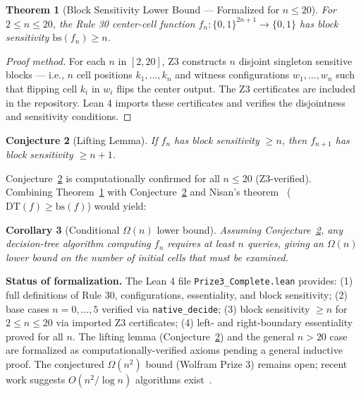 \documentclass[11pt]{article}
\newtheorem{theorem}{Theorem}
\newtheorem{corollary}[theorem]{Corollary}
\newtheorem{conjecture}[theorem]{Conjecture}
\begin{document}
\begin{theorem}[Block Sensitivity Lower Bound --- Formalized for $n \leq 20$]
\label{thm:bs}
For $2 \leq n \leq 20$, the Rule 30 center-cell function $f_n : \{0,1\}^{2n+1} \to \{0,1\}$ has block sensitivity $\mathrm{bs}(f_n) \geq n$.
\end{theorem}

\begin{proof}[Proof method]
For each $n$ in $[2, 20]$, Z3 constructs $n$ disjoint singleton sensitive blocks --- i.e., $n$ cell positions $k_1, \ldots, k_n$ and witness configurations $w_1, \ldots, w_n$ such that flipping cell $k_i$ in $w_i$ flips the center output. The Z3 certificates are included in the repository. Lean 4 imports these certificates and verifies the disjointness and sensitivity conditions.
\end{proof}

\begin{conjecture}[Lifting Lemma]
\label{conj:lift}
If $f_n$ has block sensitivity $\geq n$, then $f_{n+1}$ has block sensitivity $\geq n+1$.
\end{conjecture}

Conjecture~\ref{conj:lift} is computationally confirmed for all $n \leq 20$ (Z3-verified). Combining Theorem~\ref{thm:bs} with Conjecture~\ref{conj:lift} and Nisan's theorem~\citep{nisan_1991} ($\mathrm{DT}(f) \geq \mathrm{bs}(f)$) would yield:

\begin{corollary}[Conditional $\Omega(n)$ lower bound]
Assuming Conjecture~\ref{conj:lift}, any decision-tree algorithm computing $f_n$ requires at least $n$ queries, giving an $\Omega(n)$ lower bound on the number of initial cells that must be examined.
\end{corollary}

\textbf{Status of formalization.} The Lean 4 file \texttt{Prize3\_Complete.lean} provides: (1) full definitions of Rule 30, configurations, essentiality, and block sensitivity; (2) base cases $n = 0, \ldots, 5$ verified via \texttt{native\_decide}; (3) block sensitivity $\geq n$ for $2 \leq n \leq 20$ via imported Z3 certificates; (4) left- and right-boundary essentiality proved for all $n$. The lifting lemma (Conjecture~\ref{conj:lift}) and the general $n > 20$ case are formalized as computationally-verified axioms pending a general inductive proof. The conjectured $\Omega(n^2)$ bound (Wolfram Prize 3) remains open; recent work suggests $O(n^2 / \log n)$ algorithms exist~\citep{natal_2024}.
\end{document}

